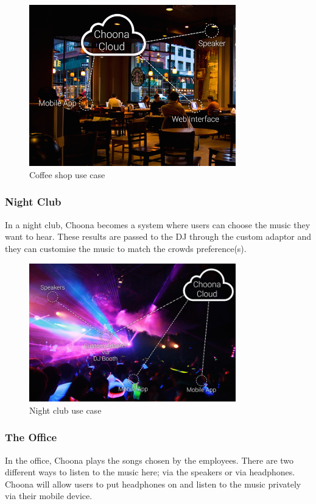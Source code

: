     \begin{figure}[h!]
      \centering
      \includegraphics[width=0.8\textwidth]{./img/coffee-shop.png}
      \caption{Coffee shop use case}
      \label{fig:coffee_shop}
    \end{figure}

\subsubsection{Night Club} 
In a night club, Choona becomes a system where users can choose the music they want to hear.  These results are passed to the DJ through the custom adaptor and they can customise the music to match the crowds preference(s).  \\

    \begin{figure}[h!]
      \centering
      \includegraphics[width=0.8\textwidth]{./img/nightclub.png}
      \caption{Night club use case}
      \label{fig:night_club}
    \end{figure}

\subsubsection{The Office} 
In the office, Choona plays the songs chosen by the employees.  There are two different ways to listen to the music here; via the speakers or via headphones.  Choona will allow users to put headphones on and listen to the music privately via their mobile device. \\

